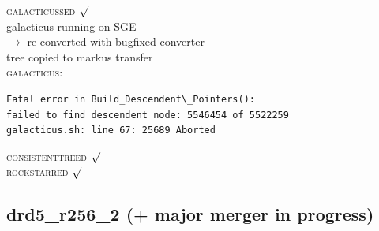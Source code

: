 \textsc{galacticussed} $\surd$  \\
galacticus running on SGE \\
$\rightarrow$ re-converted with bugfixed converter \\
tree copied to markus transfer \\
\textsc{galacticus}: 
\begin{verbatim}
Fatal error in Build_Descendent\_Pointers():
failed to find descendent node: 5546454 of 5522259
galacticus.sh: line 67: 25689 Aborted  
\end{verbatim}
\textsc{consistenttreed} $\surd$  \\ 
\textsc{rockstarred} $\surd$ \\ 

% 
%
%
%
%
%
%
%

\newpage
\subsection{drd5\_r256\_2 (+ major merger in progress)} 

